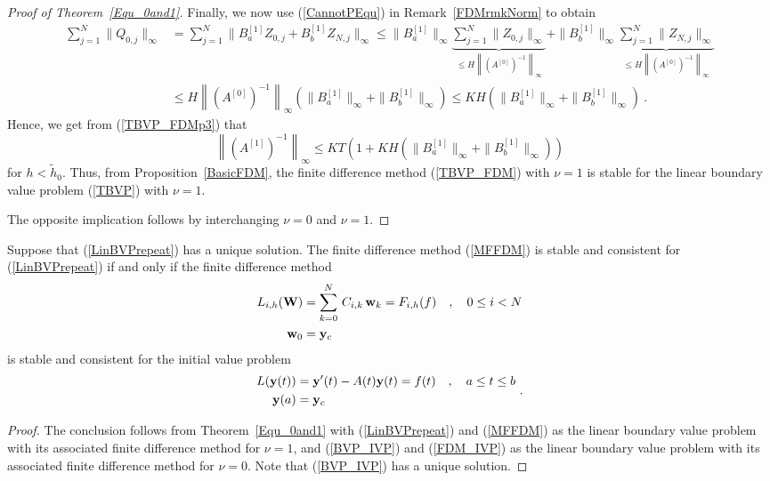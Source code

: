\begin{proof}[Proof of Theorem~\ref{Equ_0and1}]
Finally, we now use (\ref{CannotPEqu}) in Remark~\ref{FDMrmkNorm} to
obtain
\begin{align*}
\sum_{j=1}^N \| Q_{0,j} \|_\infty
&= \sum_{j=1}^N \| B_a^{[1]} Z_{0,j} + B_b^{[1]} Z_{N,j} \|_\infty
\leq \|B_a^{[1]}\|_\infty \underbrace{\sum_{j=1}^N \| Z_{0,j} \|_\infty}_{\leq
H \left\|(A^{[0]})^{-1}\right\|_\infty}
+ \| B_b^{[1]}\|_\infty \underbrace{\sum_{j=1}^N \| Z_{N,j} \|_\infty}_{\leq
H \left\|(A^{[0]})^{-1}\right\|_\infty} \\
&\leq H \left\| \left( A^{[0]}\right)^{-1}\right\|_\infty
\left( \| B_a^{[1]} \|_\infty + \| B_b^{[1]} \|_\infty \right)
\leq K H \left( \| B_a^{[1]} \|_\infty + \| B_b^{[1]} \|_\infty \right) \ .
\end{align*}
Hence, we get from
(\ref{TBVP_FDMp3}) that
\[
\left\| \left(A^{[1]}\right)^{-1} \right\|_\infty \leq K T \left(1 + K H \left(
\| B_a^{[1]} \|_\infty + \| B_b^{[1]} \|_\infty \right)\right)
\]
for $h < \tilde{h}_0$.  Thus, from Proposition~\ref{BasicFDM}, the finite
difference method (\ref{TBVP_FDM}) with $\nu=1$ is stable for the
linear boundary value problem (\ref{TBVP}) with $\nu=1$.

The opposite implication follows by interchanging $\nu=0$ and $\nu=1$.
\end{proof}

\begin{cor}
Suppose that (\ref{LinBVPrepeat}) has a unique solution.  The
finite difference method (\ref{MFFDM}) is stable and consistent for
(\ref{LinBVPrepeat}) if and only if the finite difference method
\begin{equation} \label{FDM_IVP}
\begin{split}
L_{i,h}(\mathbf{W}) &= \sum_{k=0}^N\,C_{i,k}\,\mathbf{w}_k
= F_{i,h}(f) \quad , \quad 0 \leq i < N \\
\mathbf{w}_0 &= \mathbf{y}_c
\end{split}
\end{equation}
is stable and consistent for the initial value problem
\begin{equation} \label{BVP_IVP}
\begin{split}
L(\mathbf{y}(t)) &= \mathbf{y}'(t) - A(t)\mathbf{y}(t) = f(t) \quad ,
\quad a \leq t \leq b\\
\mathbf{y}(a) &= \mathbf{y}_c
\end{split} \ .
\end{equation}
\label{CorSC_FDM}
\end{cor}

\begin{proof}
The conclusion follows from Theorem~\ref{Equ_0and1} with
(\ref{LinBVPrepeat}) and (\ref{MFFDM}) as the linear boundary value
problem with its associated finite difference method for $\nu=1$, and
(\ref{BVP_IVP}) and (\ref{FDM_IVP}) as the linear boundary value
problem with its associated finite difference method for $\nu=0$.
Note that (\ref{BVP_IVP}) has a unique solution.
\end{proof}

